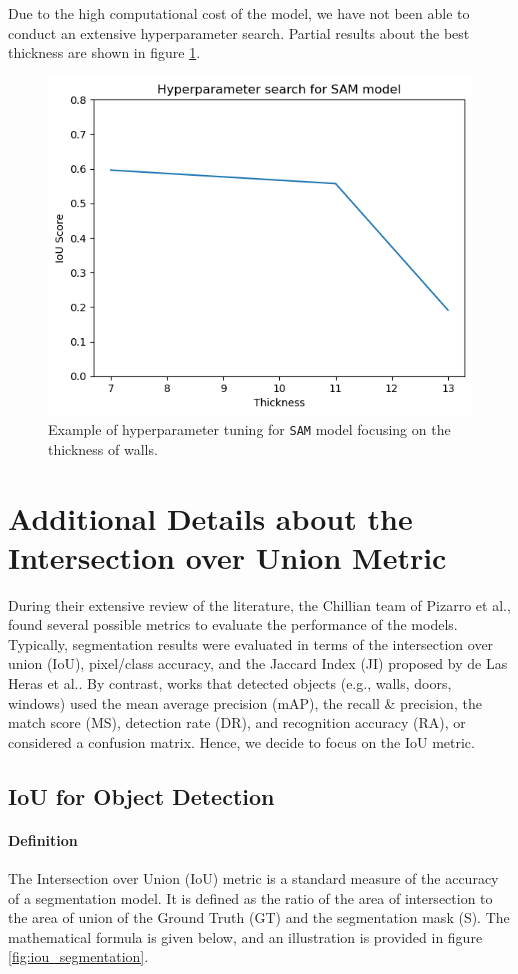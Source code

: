 \documentclass[11pt]{article}
\begin{document}
Due to the high computational cost of the model, we have not been able to
conduct an extensive hyperparameter search. Partial results about the best
thickness are shown in figure \ref{fig:SAM_hyperparameters}.
\begin{figure}[htb!]
    \centering
    \includegraphics[width=0.5\linewidth]{figures/SAM_hyperparameters.png}
    \caption{Example of hyperparameter tuning for \texttt{SAM} model focusing on the thickness of walls.}
    \label{fig:SAM_hyperparameters}
\end{figure}


\section{Additional Details about the Intersection over Union Metric}
\label{app:sec:IoUdetails}
During their extensive review of the literature, the Chillian team of
Pizarro et al.\cite{PIZARRO2022104348}, 
found several possible
metrics to evaluate the performance of the models. 
Typically, segmentation results were evaluated in terms
of the intersection over union (IoU), pixel/class accuracy, and
the Jaccard Index (JI) proposed by de Las Heras et al.. By contrast, works that 
detected objects (e.g., walls, doors, windows) used
the mean average precision (mAP), the recall \& precision, the match
score (MS), detection rate (DR), and recognition accuracy (RA),
or considered a confusion matrix.
Hence, we decide to focus on the IoU metric.

\subsection{IoU for Object Detection}
\paragraph{Definition} The Intersection over Union (IoU) metric is a standard
measure of the accuracy of a segmentation model. It is defined as the ratio of
the area of intersection to the area of union of the Ground Truth (GT) and the 
segmentation mask (S). The mathematical formula is given below, and an illustration
is provided in figure \ref{fig:iou_segmentation}.
\end{document}
